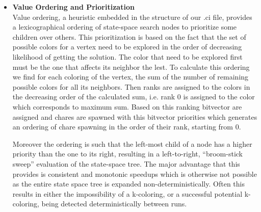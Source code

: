 \documentclass[10pt,twoside]{article}
\begin{document}
\begin{itemize}
  \item \textbf{Value Ordering and Prioritization} \\
            Value ordering, a heuristic embedded in the structure of our .ci file,
          provides a lexicographical ordering of state-space search nodes to
            prioritize some children over others. This prioritization is based
            on the fact that the set of possible colors for a vertex 
            need to be explored in the order of decreasing likelihood of getting the
            solution. The color that need to be explored first must be the one that affects its neighbor the lest.
            To calculate this ordering we find for each coloring of the vertex, the sum of the number of remaining possible colors 
            for all its neighbors. Then ranks are assigned to the colors in the decreasing order of the calculated sum, i.e.
              rank 0 is assigned to the color which corresponds to maximum sum. Based on this ranking
                bitvector are assigned and chares are spawned with this bitvector priorities which generates
                an ordering of chare spawning in the order of their rank, starting from 0. 
            
                Moreover the ordering   is such that the left-most child of a node has a
            higher priority than the one to its right, resulting in a
            left-to-right, “broom-stick sweep” evaluation of the state-space
            tree. The major advantage that this provides is consistent and monotonic
            speedups which is otherwise  not possible as the entire state
            space tree is  expanded non-deterministically. 
            Often this results in either the impossibility of a k-coloring, or a
            successful potential k-coloring, being detected deterministically between runs.


\end{itemize}
\end{document}
